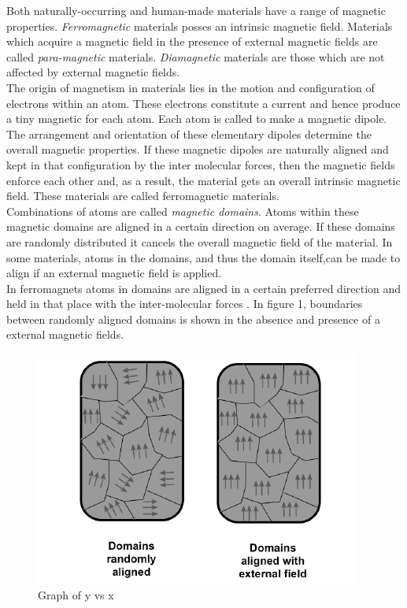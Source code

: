 Both naturally-occurring and human-made materials have a range of magnetic properties. \textit{Ferromagnetic } materials posses an intrinsic magnetic field. Materials which acquire a magnetic field in the presence of external magnetic fields are called \textit{para-magnetic} materials. \textit{Diamagnetic} materials are those which are not affected by external magnetic fields. \\
The origin of magnetism in materials lies in the motion and configuration of electrons within an atom. These electrons constitute a current and hence produce a tiny magnetic for each atom. Each atom is called to make a magnetic dipole. The arrangement and orientation of these elementary dipoles determine the overall magnetic properties. If these magnetic dipoles are naturally aligned and kept in that configuration by the inter molecular forces, then the magnetic fields enforce each other and, as a result, the material gets an overall intrinsic magnetic field. These materials are called ferromagnetic materials.\\
Combinations of atoms are called \textit{magnetic domains}. Atoms within these magnetic domains are aligned in a certain direction on average. If these domains are randomly distributed it cancels the overall magnetic field of the material. In some materials, atoms in the domains, and thus the domain itself,can be made to align if an external magnetic field is applied. \\
In ferromagnets atoms in domains are aligned in a certain preferred direction and held in that place with the inter-molecular forces . In figure 1, boundaries between randomly aligned domains is shown in the absence and presence of a external magnetic fields.
\begin{figure}[h!]
    \centering
    \includegraphics[width=\textwidth]{figures/Domains.png}
    \caption{Graph of y vs x}
    \label{fig:yx}
\end{figure}\\
